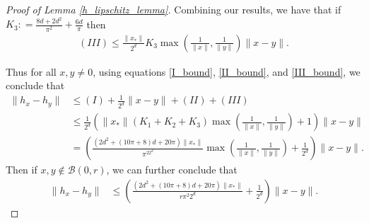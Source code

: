 \documentclass[11pt]{article}
\theoremstyle{remark}
\begin{document}
\begin{proof}[Proof of Lemma \ref{h_lipschitz_lemma}]
  Combining our results, we have that if $
K_3 : = \frac{8d+2d^2}{\pi^2} + \frac{6d}{\pi}$ then\begin{align}
(III) \leqslant \frac{\|x_*\|}{2^d}K_3 \max\left(\frac{1}{\|x\|},\frac{1}{\|y\|}\right)\|x-y\|. \label{III_bound}
\end{align}

Thus for all $x,y\neq 0$, using equations \eqref{I_bound}, \eqref{II_bound}, and \eqref{III_bound}, we conclude that  \begin{align*}
\|h_x - h_y\|  &\leqslant (I) + \frac{1}{2^d}\|x-y\| + (II) + (III) \\
&\leqslant \frac{1}{2^d}\left(\|x_*\|(K_1 + K_2 + K_3)\max\left(\frac{1}{\|x\|},\frac{1}{\|y\|}\right) + 1\right)\|x-y\| \\
& = \left(\frac{(2d^2 + (10\pi+8)d+20\pi)\|x_*\|}{\pi^22^d}\max\left(\frac{1}{\|x\|},\frac{1}{\|y\|}\right) + \frac{1}{2^d}\right)\|x-y\|.
\end{align*} %
Then if $x,y \notin \mathcal{B}(0,r)$, we can further conclude that \begin{align*}
\|h_{x} - h_y\| & \leqslant \left(\frac{(2d^2 + (10\pi+8)d+20\pi)\|x_*\|}{r\pi^2 2^d} + \frac{1}{2^d}\right)\|x-y\|.
\end{align*}
\end{proof}
\end{document}
